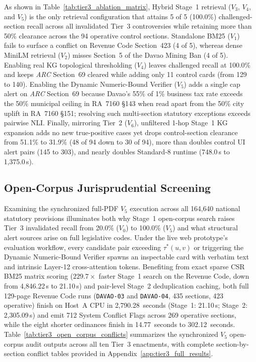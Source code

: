 As shown in Table~\ref{tab:tier3_ablation_matrix}, Hybrid Stage~1 retrieval ($V_3$, $V_4$, and $V_5$) is the only retrieval configuration that attains 5 of 5 (100.0\%) challenged-section recall across all invalidated Tier~3 controversies while retaining more than 50\% clearance across the 94 operative control sections. Standalone BM25 ($V_1$) fails to surface a conflict on Revenue Code Section~423 (4 of 5), whereas dense MiniLM retrieval ($V_2$) misses Section~5 of the Davao Mining Ban (4 of 5). Enabling real KG topological thresholding ($V_4$) leaves challenged recall at 100.0\% and keeps \textit{ARC} Section~69 cleared while adding only 11 control cards (from 129 to 140). Enabling the Dynamic Numeric-Bound Verifier ($V_5$) adds a single cap alert on \textit{ARC} Section~69 because Davao's 55\% of 1\% business tax rate exceeds the 50\% municipal ceiling in RA~7160 \S143 when read apart from the 50\% city uplift in RA~7160 \S151; resolving such multi-section statutory exceptions exceeds pairwise NLI. Finally, mirroring Tier~2 ($V_6$), unfiltered 1-hop Stage~1 KG expansion adds no new true-positive cases yet drops control-section clearance from 51.1\% to 31.9\% (48 of 94 down to 30 of 94), more than doubles control UI alert pairs (145 to 303), and nearly doubles Standard-8 runtime (748.0\,s to 1,375.0\,s).


\subsection{Open-Corpus Jurisprudential Screening}
\label{sec:tier3_open_corpus_preemption}

Examining the synchronized full-PDF $V_5$ execution across all 164,640 national statutory provisions illuminates both why Stage~1 open-corpus search raises Tier~3 invalidated recall from 20.0\% ($V_0$) to 100.0\% ($V_5$) and what structural alert sources arise on full legislative codes. Under the live web prototype's evaluation workflow, every candidate pair exceeding $\tau^*(u, v)$ or triggering the Dynamic Numeric-Bound Verifier spawns an inspectable card with verbatim text and intrinsic Layer-12 cross-attention tokens. Benefiting from exact sparse CSR BM25 matrix scoring ($229.7\times$ faster Stage~1 search on the Revenue Code, down from 4,846.22\,s to 21.10\,s) and pair-level Stage~2 deduplication caching, both full 129-page Revenue Code runs (\texttt{DAVAO-03} and \texttt{DAVAO-04}, 435 sections, 423 operative) finish on Host~A CPU in 2,790.28~seconds (Stage~1: 21.10\,s; Stage~2: 2,305.09\,s) and emit 712 System Conflict Flags across 269 operative sections, while the eight shorter ordinances finish in 14.77~seconds to 302.12~seconds. Table~\ref{tab:tier3_open_corpus_conflicts} summarizes the synchronized $V_5$ open-corpus audit outputs across all ten Tier~3 enactments, with complete section-by-section conflict tables provided in Appendix~\ref{app:tier3_full_results}.

